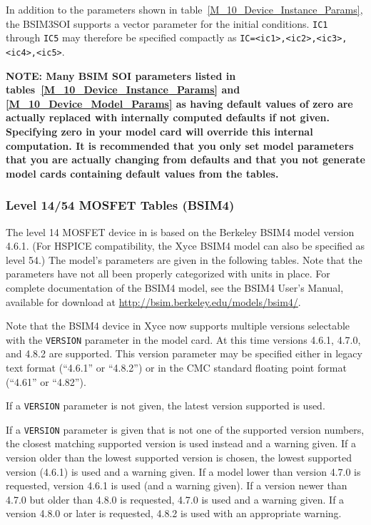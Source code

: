 In addition to the parameters shown in table~\ref{M_10_Device_Instance_Params}, 
the BSIM3SOI supports a vector parameter for the initial conditions.    \texttt{IC1} through \texttt{IC5}
may therefore be specified compactly as \texttt{IC=<ic1>,<ic2>,<ic3>, <ic4>,<ic5>}.

\textbf{NOTE:  Many BSIM SOI parameters listed in
tables~\ref{M_10_Device_Instance_Params} and \ref{M_10_Device_Model_Params} as
having default values of zero are actually replaced with internally computed
defaults if not given.  Specifying zero in your model card will override this
internal computation.  It is recommended that you only set model parameters
that you are actually changing from defaults and that you not generate model
cards containing default values from the tables.}



\clearpage
\subsubsection{Level 14/54 MOSFET Tables (BSIM4)}
The level 14 MOSFET device in \Xyce{} is based on the Berkeley BSIM4 model
version 4.6.1.  (For HSPICE compatibility, the Xyce BSIM4 model can also be
specified as level 54.)  The model's parameters are given in the following
tables.  Note that the parameters have not all been properly categorized with
units in place.  For complete documentation of the BSIM4 model, see the BSIM4
User’s Manual, available for download at
\url{http://bsim.berkeley.edu/models/bsim4/}.

Note that the BSIM4 device in Xyce now supports multiple versions
selectable with the \texttt{VERSION} parameter in the model card.  At
this time versions 4.6.1, 4.7.0, and 4.8.2 are supported.  This
version parameter may be specified either in legacy text format
(``4.6.1'' or ``4.8.2'') or in the CMC standard floating point format
(``4.61'' or ``4.82'').

If a \texttt{VERSION} parameter is not given, the latest version
supported is used.

If a \texttt{VERSION} parameter is given that is not one of the
supported version numbers, the closest matching supported version is
used instead and a warning given.  If a version older than the lowest
supported version is chosen, the lowest supported version (4.6.1) is
used and a warning given.  If a model lower than version 4.7.0 is
requested, version 4.6.1 is used (and a warning given).  If a version
newer than 4.7.0 but older than 4.8.0 is requested, 4.7.0 is used and
a warning given.  If a version 4.8.0 or later is requested, 4.8.2 is
used with an appropriate warning.

